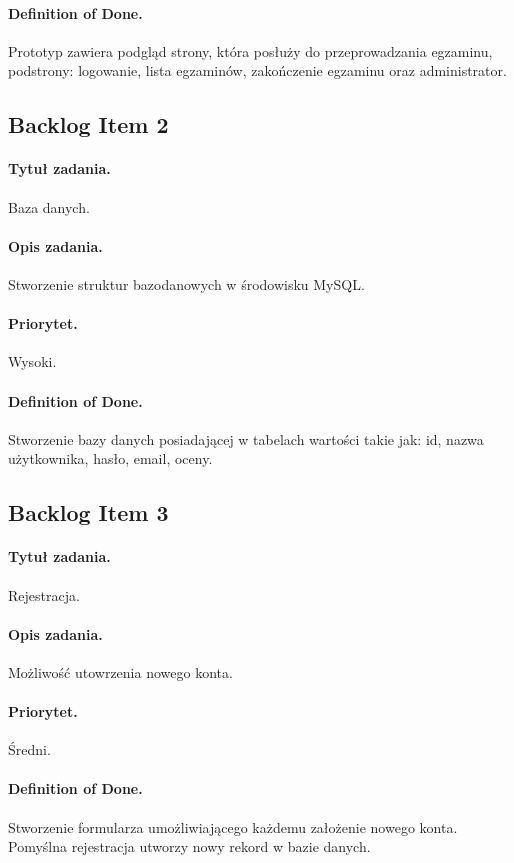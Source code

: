 \documentclass[a4paper]{article}
\begin{document}
\paragraph{Definition of Done.} Prototyp zawiera podgląd strony, która posłuży do przeprowadzania egzaminu, podstrony: logowanie, lista egzaminów, zakończenie egzaminu oraz administrator.

\subsection{Backlog Item 2}
\paragraph{Tytuł zadania.} Baza danych.
\paragraph{Opis zadania.} Stworzenie struktur bazodanowych w środowisku MySQL.
\paragraph{Priorytet.} Wysoki.
\paragraph{Definition of Done.} Stworzenie bazy danych posiadającej w tabelach wartości takie jak: id, nazwa użytkownika, hasło, email, oceny.

\subsection{Backlog Item 3}
\paragraph{Tytuł zadania.} Rejestracja.
\paragraph{Opis zadania.} Możliwość utowrzenia nowego konta.
\paragraph{Priorytet.} Średni.
\paragraph{Definition of Done.} Stworzenie formularza umożliwiającego każdemu założenie nowego konta. Pomyślna rejestracja utworzy nowy rekord w bazie danych.
\end{document}
